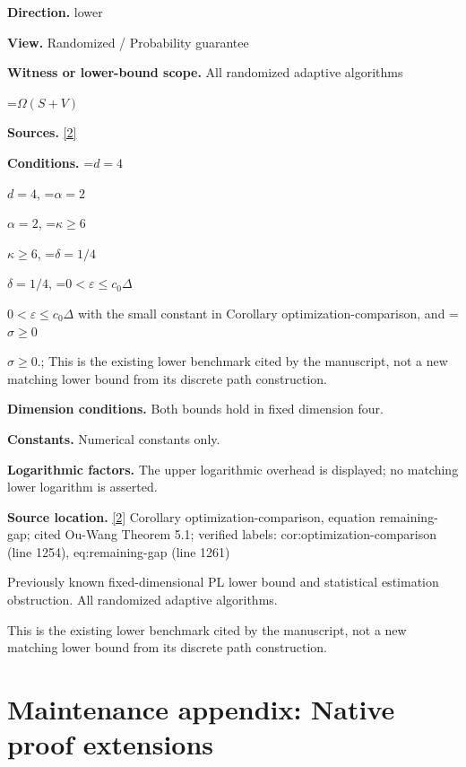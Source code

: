 \documentclass[10pt,a4paper]{article}
\newcommand{\AtlasMath}[1]{\par\begingroup\centering\setbox0=\hbox{$\displaystyle #1$}\ifdim\wd0>1.4\linewidth\typeout{ATLAS WIDE FORMULA: \the\wd0}\fi\ifdim\wd0>\linewidth\resizebox{\linewidth}{!}{\box0}\else\box0\fi\par\endgroup}
\newcommand{\AtlasInlineMath}[1]{\begingroup\setbox0=\hbox{$#1$}\ifdim\wd0>.4\linewidth\endgroup\AtlasMath{#1}\else\endgroup$#1$\fi}
\begin{document}
\textbf{Direction.} lower



\textbf{View.} Randomized / Probability guarantee



\textbf{Witness or lower-bound scope.} All randomized adaptive algorithms



\AtlasMath{\Omega(S+V)}


\textbf{Sources.} \href{https://github.com/WU-Wendao/Colombo/blob/main/colombo_sensorium/Complexity_altas/data/sources/colombo/N13/manuscript.pdf}{[2]}



\textbf{Conditions.} \AtlasInlineMath{d=4}, \AtlasInlineMath{\alpha=2}, \AtlasInlineMath{\kappa\ge6}, \AtlasInlineMath{\delta=1/4}, \AtlasInlineMath{0<\varepsilon\le c_0\Delta} with the small constant in Corollary optimization-comparison, and \AtlasInlineMath{\sigma\ge0}.; This is the existing lower benchmark cited by the manuscript, not a new matching lower bound from its discrete path construction.



\textbf{Dimension conditions.} Both bounds hold in fixed dimension four.



\textbf{Constants.} Numerical constants only.



\textbf{Logarithmic factors.} The upper logarithmic overhead is displayed; no matching lower logarithm is asserted.



\textbf{Source location.} \href{https://github.com/WU-Wendao/Colombo/blob/main/colombo_sensorium/Complexity_altas/data/sources/colombo/N13/manuscript.pdf}{[2]} Corollary optimization-comparison, equation remaining-gap; cited Ou-Wang Theorem 5.1; verified labels: cor:optimization-comparison (line 1254), eq:remaining-gap (line 1261)



Previously known fixed-dimensional PL lower bound and statistical estimation obstruction. All randomized adaptive algorithms.



This is the existing lower benchmark cited by the manuscript, not a new matching lower bound from its discrete path construction.



\section{Maintenance appendix: Native proof extensions}
\end{document}
